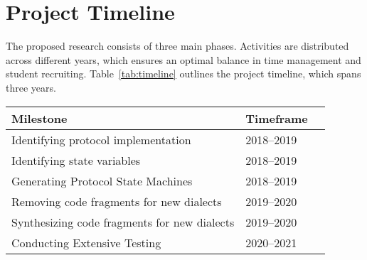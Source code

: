 \section{Project Timeline}
\label{sec:timeline}


The proposed research consists of three main phases. Activities are distributed
across different years, which ensures an optimal balance in time management and
student recruiting. Table~\ref{tab:timeline} outlines the project timeline,
which spans three years. 






\begin{center}
  \begin{tabular}{lll}
    \toprule
    Milestone & Timeframe  \\
    \midrule
    Identifying  protocol implementation                  & 2018--2019      \\
    Identifying state variables                           & 2018--2019      \\
    Generating Protocol State Machines                    & 2018--2019      \\
    Removing code fragments for new dialects              & 2019--2020      \\
    Synthesizing code fragments for new dialects          & 2019--2020      \\
    Conducting Extensive Testing                          & 2020--2021      \\
    \bottomrule
  \end{tabular}
  \label{tab:timeline}
\end{center}


